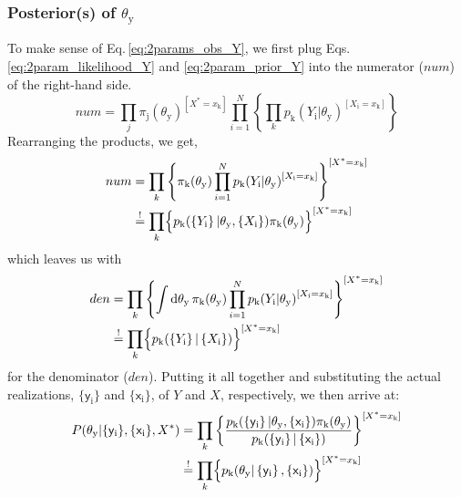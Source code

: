 \documentclass[]{report}
\begin{document}
\subsubsection{Posterior(s) of $\theta_\mathrm{y}$}
To make sense of Eq.\,\ref{eq:2params_obs_Y}, we first plug Eqs.\,\ref{eq:2param_likelihood_Y} and \ref{eq:2param_prior_Y} into the numerator ($num$) of the right-hand side.
\begin{equation}
num 
=
\prod_{j}
	{
		\pi_\mathrm{j}( \theta_\mathrm{y} )
	}^{
		[ X^* = x_\mathrm{k} ]
	}
\prod_{i=1}^{N}
	\left\{
		\prod_{k}
			{
				p_\mathrm{k}( Y_\mathrm{i} | \theta_\mathrm{y} )
			}^{
			[ X_\mathrm{i} = x_\mathrm{k} ]
		}
	\right\}
\end{equation}
Rearranging the products, we get,
\begin{align}
num 
&=
\prod_{k}
	\left\{
		\pi_\mathrm{k}( \theta_\mathrm{y} )
		\prod_{i=1}^{N}
			{
				p_\mathrm{k}( Y_\mathrm{i} |\theta_\mathrm{y} )
			}^{
				[ X_\mathrm{i} = x_\mathrm{k} ]
			}
	\right\}^{
		[ X^* = x_\mathrm{k} ]
	}
\nonumber \\
&\stackrel{!}{=}
\prod_{k}
	\Bigl\{
		p_\mathrm{k}(
			\left\{ Y_\mathrm{i} \right\} |
			\theta_\mathrm{y},
			\left\{ X_\mathrm{i} \right\}
		)
		\pi_\mathrm{k}( \theta_\mathrm{y} )
	\Bigr\}^{
		[ X^* = x_\mathrm{k} ]
	}
\end{align}
which leaves us with
\begin{align}
den 
&= 
\prod_{k}
	\left\{
		\int \mathrm{d}\theta_\mathrm{y} \,
			\pi_\mathrm{k}( \theta_\mathrm{y} )
			\prod_{i=1}^{N}
				{
					p_\mathrm{k}( Y_\mathrm{i} | \theta_\mathrm{y} )
				}^{
					[ X_\mathrm{i} = x_\mathrm{k} ]
				}
	\right\}^{
		[ X^* = x_\mathrm{k} ]
	} 
\nonumber \\
&\stackrel{!}{=}
\prod_{k}
	\Bigl\{
		p_\mathrm{k}( \left\{ Y_\mathrm{i} \right\} | \left\{ X_\mathrm{i} \right\} )
	\Bigr\}^{
		[ X^* = x_\mathrm{k} ]
	}
\end{align}
for the denominator ($den$). Putting it all together and substituting the actual realizations, $ \{ \mathsf{y}_\mathrm{i} \} $ and $ \{ \mathsf{x}_\mathrm{i} \} $, of $Y$ and $X$, respectively, we then arrive at:
\begin{align}
P( \theta_\mathrm{y} | \{ \mathsf{y}_\mathrm{i} \}, \{ \mathsf{x}_\mathrm{i} \}, X^*) 
&=
\prod_{k}
	\left\{
		\frac
			{
				p_\mathrm{k}(
					\left\{ \mathsf{y}_\mathrm{i} \right\} |
					\theta_\mathrm{y}, 
					\left\{ \mathsf{x}_\mathrm{i} \right\}
				)
				\pi_\mathrm{k}( \theta_\mathrm{y} )
			}
			{
				p_\mathrm{k}(
					\left\{ \mathsf{y}_\mathrm{i} \right\} |
					\left\{ \mathsf{x}_\mathrm{i} \right\} )
			}
	\right\}^{
		[ X^* = x_\mathrm{k} ]
	}
\nonumber \\
&\stackrel{!}{=}
\prod_{k}
	\Bigl\{
		p_\mathrm{k}(
			\theta_\mathrm{y} |
			\left\{ \mathsf{y}_\mathrm{i} \right\},
			\left\{ \mathsf{x}_\mathrm{i} \right\}
		)
	\Bigr\}^{
		[ X^* = x_\mathrm{k} ]
	} 
\end{align}
\end{document}
